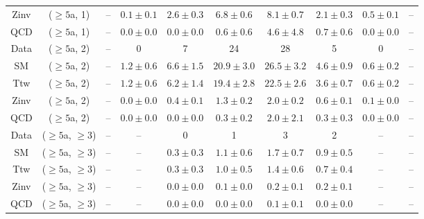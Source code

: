 \begin{table}[h!]
{\begin{tabular}{cccccccccc}
	Zinv & ($\ge5$a, 1) & -- & $0.1\pm 0.1$ & $2.6\pm 0.3$ & $6.8\pm 0.6$ & $8.1\pm 0.7$ & $2.1\pm 0.3$ & $0.5\pm 0.1$ & -- \\[0.5ex] 
	QCD & ($\ge5$a, 1) & -- & $0.0\pm 0.0$ & $0.0\pm 0.0$ & $0.6\pm 0.6$ & $4.6\pm 4.8$ & $0.7\pm 0.6$ & $0.0\pm 0.0$ & -- \\[0.5ex] 
	Data & ($\ge5$a, 2) & -- & 0 & 7 & 24 & 28 & 5 & 0 & -- \\[0.5ex] 
	SM & ($\ge5$a, 2) & -- & $1.2\pm 0.6$ & $6.6\pm 1.5$ & $20.9\pm 3.0$ & $26.5\pm 3.2$ & $4.6\pm 0.9$ & $0.6\pm 0.2$ & -- \\[0.5ex] 
	Ttw & ($\ge5$a, 2) & -- & $1.2\pm 0.6$ & $6.2\pm 1.4$ & $19.4\pm 2.8$ & $22.5\pm 2.6$ & $3.6\pm 0.7$ & $0.6\pm 0.2$ & -- \\[0.5ex] 
	Zinv & ($\ge5$a, 2) & -- & $0.0\pm 0.0$ & $0.4\pm 0.1$ & $1.3\pm 0.2$ & $2.0\pm 0.2$ & $0.6\pm 0.1$ & $0.1\pm 0.0$ & -- \\[0.5ex] 
	QCD & ($\ge5$a, 2) & -- & $0.0\pm 0.0$ & $0.0\pm 0.0$ & $0.3\pm 0.2$ & $2.0\pm 2.1$ & $0.3\pm 0.3$ & $0.0\pm 0.0$ & -- \\[0.5ex] 
	Data & ($\ge5$a, $\ge3$) & -- & -- & 0 & 1 & 3 & 2 & -- & -- \\[0.5ex] 
	SM & ($\ge5$a, $\ge3$) & -- & -- & $0.3\pm 0.3$ & $1.1\pm 0.6$ & $1.7\pm 0.7$ & $0.9\pm 0.5$ & -- & -- \\[0.5ex] 
	Ttw & ($\ge5$a, $\ge3$) & -- & -- & $0.3\pm 0.3$ & $1.0\pm 0.5$ & $1.4\pm 0.6$ & $0.7\pm 0.4$ & -- & -- \\[0.5ex] 
	Zinv & ($\ge5$a, $\ge3$) & -- & -- & $0.0\pm 0.0$ & $0.1\pm 0.0$ & $0.2\pm 0.1$ & $0.2\pm 0.1$ & -- & -- \\[0.5ex] 
	QCD & ($\ge5$a, $\ge3$) & -- & -- & $0.0\pm 0.0$ & $0.0\pm 0.0$ & $0.1\pm 0.1$ & $0.0\pm 0.0$ & -- & -- \\[0.5ex] 
	\hline
	\hline
\end{tabular}}
\end{table}
